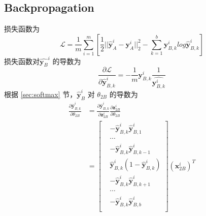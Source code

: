 \documentclass[lang=cn,11pt,a4paper,cite=authoryear]{elegantpaper}
\newcommand{\diff}[2]{\frac{\partial #1}{\partial #2}}
\begin{document}
\subsection{Backpropagation}
损失函数为 $$\mathcal{L}=\frac{1}{m}\sum_{i=1}^m \left[ \frac{1}{2}||\hat{\mathbf{y}}_A^i-\mathbf{y}_A^i||_2^2-\sum_{k=1}^b\mathbf{y}_{B,k}^i log\hat{\mathbf{y}}_{B,k}^i \right]$$
损失函数对$\hat{\mathbf{y}_B}^i$ 的导数为
\begin{equation}
  \diff{\mathcal{L}}{\hat{\mathbf{y}}_{B,k}^i}=-\frac{1}{m}\mathbf{y}_{B,k}^i\frac{1}{\hat{\mathbf{y}_{B,k}^i}}
\end{equation}
根据 \ref{sec:softmax} 节，$\hat{\mathbf{y}}_{B}^i$ 对 $\theta_{2B}$ 的导数为
\begin{equation}
  \begin{aligned}
    \diff{\hat{\mathbf{y}}_{B,k}^i}{\theta_{2B}}&=\diff{\hat{\mathbf{y}}_{B,k}^i}{\mathbf{z}^i_{2B}}\diff{\mathbf{z}^i_{2B}}{\theta_{2B}} \\
    &=\left [   
      \begin{aligned}
        &-\hat{\mathbf{y}}_{B,k}^i \hat{\mathbf{y}}_{B,1}^i \\
        &\cdots\\
        &-\hat{\mathbf{y}}_{B,k}^i \hat{\mathbf{y}}_{B,k-1}^i \\
        &\hat{\mathbf{y}}_{B,k}^i(1-\hat{\mathbf{y}}_{B,k}^i)\\
        &-\hat{\mathbf{y}}_{B,k}^i \hat{\mathbf{y}}_{B,k+1}^i \\
        &\cdots \\
        &-\hat{\mathbf{y}}_{B,k}^i \hat{\mathbf{y}}_{B,b}^i\\
    \end{aligned}
    \right] (\mathbf{x}_{2B}^i)^T
  \end{aligned}
\end{equation}
\end{document}
